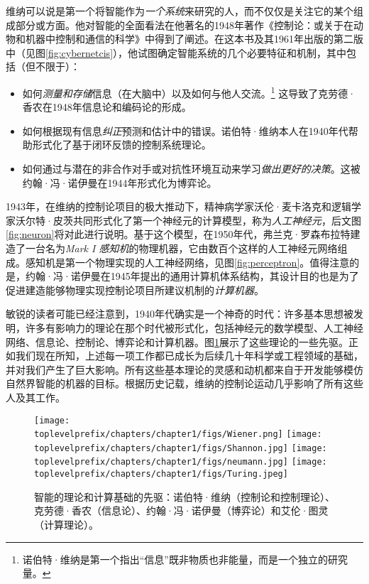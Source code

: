 \documentclass[../../book-main_zh.tex]{subfiles}
\begin{document}
维纳可以说是第一个将智能作为{\em 一个系统}来研究的人，而不仅仅是关注它的某个组成部分或方面。他对智能的全面看法在他著名的1948年著作《控制论：或关于在动物和机器中控制和通信的科学》\cite{Wiener-Cybernetics-1948}中得到了阐述。在这本书及其1961年出版的第二版中（见图\ref{fig:cybernetcis}），他试图确定智能系统的几个必要特征和机制，其中包括（但不限于）：
\begin{itemize}
    \item 如何{\em 测量和存储}信息（在大脑中）以及如何与他人交流。\footnote{诺伯特·维纳是第一个指出“信息”既非物质也非能量，而是一个独立的研究量。} 这导致了克劳德·香农在1948年信息论和编码论的形成。
    \item 如何根据现有信息{\em 纠正}预测和估计中的错误。诺伯特·维纳本人在1940年代帮助形式化了基于闭环反馈的控制系统理论。
    \item 如何通过与潜在的非合作对手或对抗性环境互动来学习{\em 做出更好的决策}。这被约翰·冯·诺伊曼在1944年形式化为博弈论。
\end{itemize}
1943年，在维纳的控制论项目的极大推动下，精神病学家沃伦·麦卡洛克和逻辑学家沃尔特·皮茨共同形式化了第一个神经元的计算模型\cite{McCulloch-Pitts}，称为{\em 人工神经元}，后文图\ref{fig:neuron}将对此进行说明。基于这个模型，在1950年代，弗兰克·罗森布拉特建造了一台名为{\em Mark I 感知机}的物理机器，它由数百个这样的人工神经元网络组成。感知机是第一个物理实现的人工神经网络，见图\ref{fig:perceptron}。值得注意的是，约翰·冯·诺伊曼在1945年提出的通用计算机体系结构，其设计目的也是为了促进建造能够物理实现控制论项目所建议机制的{\em 计算机器}。

敏锐的读者可能已经注意到，1940年代确实是一个神奇的时代：许多基本思想被发明，许多有影响力的理论在那个时代被形式化，包括神经元的数学模型、人工神经网络、信息论、控制论、博弈论和计算机器。图\ref{fig:god-fathers}展示了这些理论的一些先驱。正如我们现在所知，上述每一项工作都已成长为后续几十年科学或工程领域的基础，并对我们产生了巨大影响。所有这些基本理论的灵感和动机都来自于开发能够模仿自然界智能的机器的目标。根据历史记载，维纳的控制论运动几乎影响了所有这些人及其工作。
\begin{figure}
    \centering
    \texttt{[image: \\toplevelprefix/chapters/chapter1/figs/Wiener.png]}
    \texttt{[image: \\toplevelprefix/chapters/chapter1/figs/Shannon.jpg]}
    \texttt{[image: \\toplevelprefix/chapters/chapter1/figs/neumann.jpg]}
    \texttt{[image: \\toplevelprefix/chapters/chapter1/figs/Turing.jpeg]}
    \caption{智能的理论和计算基础的先驱：诺伯特·维纳（控制论和控制理论）、克劳德·香农（信息论）、约翰·冯·诺伊曼（博弈论）和艾伦·图灵（计算理论）。}
    \label{fig:god-fathers}
\end{figure}
\end{document}

